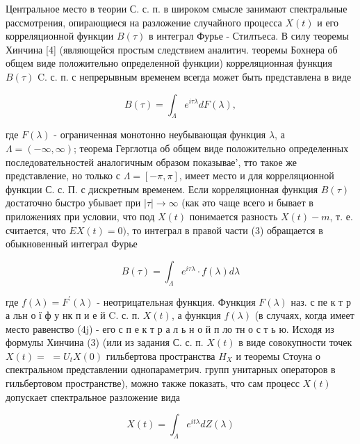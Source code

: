 \documentclass[10pt]{article}
\begin{document}
Центральное место в теории С. с. п. в широком смысле занимают спектральные рассмотрения, опирающиеся на разложение случайного процесса $X(t)$ и его корреляционной функции $B(\tau)$ в интеграл Фурье - Стилтьеса. В силу теоремы Хинчина [4] (являющейся простым следствием аналитич. теоремы Бохнера об общем виде положительно определенной функции) корреляционная функция $B(\tau)$ C. с. п. с непрерывным временем всегда может быть представлена в виде



\[

B(\tau)=\int_{\Lambda} e^{i \tau \lambda} d F(\lambda),

\]



где $F(\lambda)$ - ограниченная монотонно неубывающая функция $\lambda$, а $\Lambda=(-\infty, \infty)$; теорема Герглотца об общем виде положительно определенных последовательностей аналогичным образом показывае', тто такое же представление, но только с $\Lambda=[-\pi, \pi]$, имеет место и для корреляционной функции С. с. П. с дискретным временем. Если корреляционная функция $B(\tau)$ достаточно быстро убывает при $|\tau| \rightarrow \infty$ (как әто чаще всего и бывает в приложениях при условии, что под $X(t)$ понимается разность $X(t)-m$, т. е. считается, что $E X(t)=0)$, то интеграл в правой части (3) обращается в обыкновенный интеграл Фурье



\[

B(\tau)=\int_{\Lambda} e^{i \tau \lambda} \cdot f(\lambda) d \lambda

\]



где $f(\lambda)=F^{\prime}(\lambda)$ - неотрицательная функция. Функция $F(\lambda)$ наз. с пе к т р а льн о ї ф у нк п и е й C. с. п. $X(t)$, а функция $f(\lambda)$ (в случаях, когда имеет место равенство (4j) - его с п е к т р а л ь н о й п ло тн о с т ь ю. Исходя из формулы Хинчина (3) (или из задания С. с. п. $X(t)$ в виде совокупности точек $X(t)=$ $=U_{t} X(0)$ гильбертова пространства $H_{X}$ и теоремы Стоуна о спектральном представлении однопараметрич. групп унитарных операторов в гильбертовом пространстве), можно также показать, что сам процесс $X(t)$ допускает спектральное разложение вида



\[

X(t)=\int_{\Lambda} e^{i t \lambda} d Z(\lambda)

\]
\end{document}
